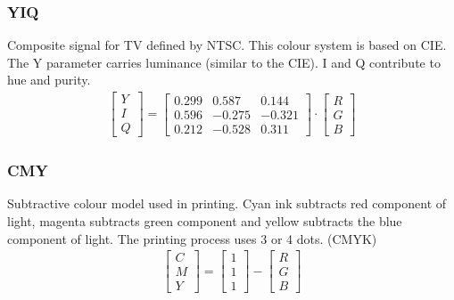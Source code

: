 \documentclass{article}
\begin{document}
\subsubsection{YIQ}
Composite signal for TV defined by NTSC.
This colour system is based on CIE.
The Y parameter carries luminance (similar to the CIE).
I and Q contribute to hue and purity.
\begin{align*}
	\begin{bmatrix}
		Y \\ I \\ Q
	\end{bmatrix}
	= 
	\begin{bmatrix}
	0.299 & 0.587 & 0.144 \\
	0.596 & -0.275 & -0.321 \\
	0.212 & -0.528 & 0.311
	\end{bmatrix}
	\cdot
	\begin{bmatrix}
		R \\ G \\ B
	\end{bmatrix}
\end{align*}

\subsubsection{CMY}
Subtractive colour model used in printing.
Cyan ink subtracts red component of light, magenta subtracts green component and yellow subtracts the blue component of light.
The printing process uses 3 or 4 dots. (CMYK)
\begin{align*}
	\begin{bmatrix}
		C \\ M \\ Y
	\end{bmatrix}
	= 
	\begin{bmatrix}
		1 \\ 1 \\ 1
	\end{bmatrix}
	-
	\begin{bmatrix}
		R \\ G \\ B
	\end{bmatrix}
\end{align*}
\end{document}
